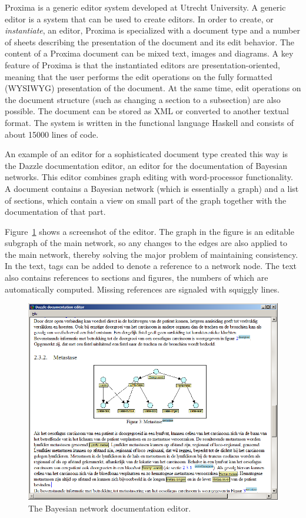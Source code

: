 \documentclass[10pt]{article}
\begin{document}
Proxima is a generic editor system developed at Utrecht University. A generic editor is a system that can be used to create editors. In order to create, or {\em instantiate}, an editor, Proxima is specialized with a document type and a number of sheets describing the presentation of the document and its edit behavior. The content of a Proxima document can be mixed text, images and diagrams. A key feature of Proxima is that the instantiated editors are presentation-oriented, meaning that the user performs the edit operations on the fully formatted (WYSIWYG) presentation of the document. At the same time, edit operations on the document structure (such as changing a section to a subsection) are also possible. The document can be stored as XML or converted to another textual format. The system is written in the functional language Haskell and consists of about 15000 lines of code.

An example of an editor for a sophisticated document type created this way is the Dazzle documentation editor, an editor for the documentation of Bayesian networks. This editor combines graph editing with word-processor functionality. A document contains a Bayesian network (which is essentially a graph) and a list of sections, which contain a view on small part of the graph together with the documentation of that part. 

Figure~\ref{fig:bayesDocEditor} shows a screenshot of the editor. The graph in the figure is an editable subgraph of the main network, so any changes to the edges are also applied to the main network, thereby solving the major problem of maintaining consistency. In the text, tags can be added to denote a reference to a network node. The text also contains references to sections and figures, the numbers of which are automatically computed. Missing references are signaled with squiggly lines.

\begin{figure}[t]
\begin{center}
\includegraphics[width=12cm]{images/subgraph}
\end{center}
\caption{The Bayesian network documentation editor.}
\label{fig:bayesDocEditor}
\end{figure}
\end{document}
